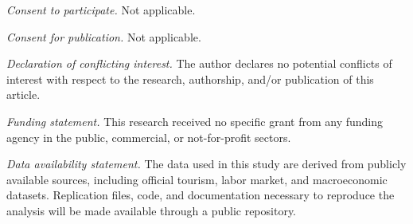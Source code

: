 \documentclass[12pt]{article}
\begin{document}
\vspace{0.5em}

\noindent
\textit{Consent to participate.} Not applicable.

\vspace{0.5em}

\noindent
\textit{Consent for publication.} Not applicable.

\vspace{0.5em}

\noindent
\textit{Declaration of conflicting interest.} The author declares no potential conflicts of interest with respect to the research, authorship, and/or publication of this article.

\vspace{0.5em}

\noindent
\textit{Funding statement.} This research received no specific grant from any funding agency in the public, commercial, or not-for-profit sectors.

\vspace{0.5em}

\noindent
\textit{Data availability statement.} The data used in this study are derived from publicly available sources, including official tourism, labor market, and macroeconomic datasets. Replication files, code, and documentation necessary to reproduce the analysis will be made available through a public repository.
\end{document}
